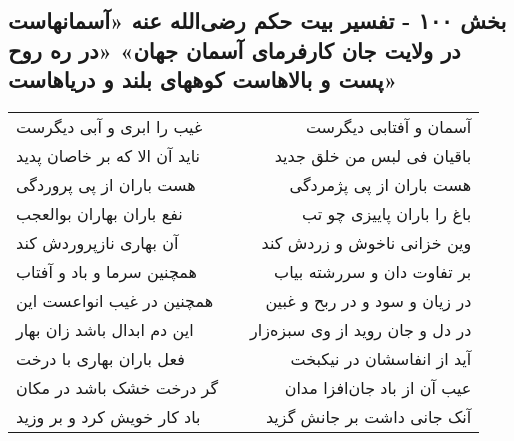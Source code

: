 \begin{center}
\section*{بخش ۱۰۰ - تفسیر بیت حکم رضی‌الله عنه «آسمانهاست در ولایت جان   کارفرمای آسمان جهان» «در ره روح پست و بالاهاست  کوههای بلند و دریاهاست»}
\label{sec:sh100}
\begin{longtable}{l p{0.5cm} r}
غیب را ابری و آبی دیگرست
&&
آسمان و آفتابی دیگرست
\\
ناید آن الا که بر خاصان پدید
&&
باقیان فی لبس من خلق جدید
\\
هست باران از پی پروردگی
&&
هست باران از پی پژمردگی
\\
نفع باران بهاران بوالعجب
&&
باغ را باران پاییزی چو تب
\\
آن بهاری نازپروردش کند
&&
وین خزانی ناخوش و زردش کند
\\
همچنین سرما و باد و آفتاب
&&
بر تفاوت دان و سررشته بیاب
\\
همچنین در غیب انواعست این
&&
در زیان و سود و در ربح و غبین
\\
این دم ابدال باشد زان بهار
&&
در دل و جان روید از وی سبزه‌زار
\\
فعل باران بهاری با درخت
&&
آید از انفاسشان در نیکبخت
\\
گر درخت خشک باشد در مکان
&&
عیب آن از باد جان‌افزا مدان
\\
باد کار خویش کرد و بر وزید
&&
آنک جانی داشت بر جانش گزید
\\
\end{longtable}
\end{center}
